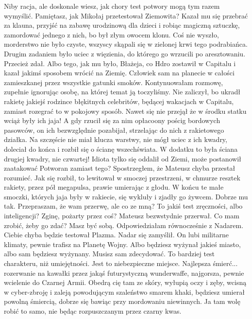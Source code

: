\begin{dialogue}
\ds{} Niby racja, ale doskonale wiesz, jak chory test potwory mogą tym razem wymyślić.
Pamiętasz, jak Mikołaj przetestował Ziemowita? Kazał mu się przebrać za klauna, przyjść na zabawę urodzinową dla dzieci i robiąc magiczną sztuczkę, zamordować jednego z nich, bo był złym owocem klonu.
Coś nie wyszło, morderstwo nie było czyste, wszyscy skąpali się w zielonej krwi tego podrabiańca.
Drugim zadaniem było uciec z więzienia, do którego go wrzucili po aresztowaniu.
\ds{} Przecież zdał.
\ds{} Albo tego, jak mu było, Błażeja, co Hdro zostawił w Capitalu i kazał jakimś sposobem wrócić na Ziemię.
Człowiek sam na planecie w całości zamieszkanej przez wszystkie gatunki smoków.
\dm{} Kontynuowałam rozmowę, zupełnie ignorując osobę, na której temat ją toczyliśmy.
\ds{} Nie zaliczył, bo ukradł rakietę jakiejś rodzince błękitnych celebritów, będącej wakacjach w Capitalu, zamiast rozegrać to w pokojowy sposób. 
Nawet się nie przejął że w środku statku wciąż były ich jaja!
A gdy rzucił się za nim opłacoony pościg bordowych pasowców, on ich bezwzględnie pozabijał, strzelając do nich z rakietowego działka.
Na szczęście nie miał klucza warstwy, nie mógł uciec z ich kwadry, doleciał do końca i rozbił się o ścianę wszechświata. 
W dodatku to była ściana drugiej kwadry, nie czwartej! 
Idiota tylko się oddalił od Ziemi, może postanowił zaatakować Potworan zamiast tego?
\dm{} Spostrzegłem, że Mateusz chyba przestał rozumieć. \dm{}
Jak się rozbił, to lewitował w smoczej przestrzeni, w chmurze resztek rakiety, przez pół megapulsa, prawie umierając z głodu.
W końcu te małe smoczki, których jaja były w rakiecie, się wykluły i zjadły go żywcem.
Dobrze mu tak.
\ds{} Przepraszam, że wam przerwę, ale co ze mną? To jakiś test zręczności, albo inteligencji? 
Zginę, pożarty przez coś? \dm{} Mateusz bezwstydnie przerwał. \dm{} Co mam zrobić, żeby go zdać?
\ds{} Masz być sobą. \dm{} Odpowiedziałam równocześnie z Nadarem.
\ds{} Ciebie chyba będzie testował Plazma. \dm{} Nadar się zamyślił. \dm{} On lubi militarne klimaty, pewnie trafisz na Planetę Wojny.
Albo będziesz wyżynał jakieś miasto, albo sam będziesz wyżynany. Musisz sam zdecydować.
To bardziej test charakteru, niż umiejętności. Jest to niebezpieczne miejsce.
Najlepsza śmierć... rozerwanie na kawałki przez jakąś futurystyczną wunderwaffe, najgorsza, pewnie wcielenie do Czarnej Armii.
Obedrą cię tam ze skóry, wyłupią oczy i zęby, wcisną w cyber-zbroję i zaleją powodującym szaleństwo smarem khaki, 
będziesz umierał powolną śmiercią, dobrze się bawiąc przy mordowaniu niewinnych. 
Ja tam wolę robić to samo, nie będąc rozpuszczanym przez czarny kwas.
\end{dialogue}

